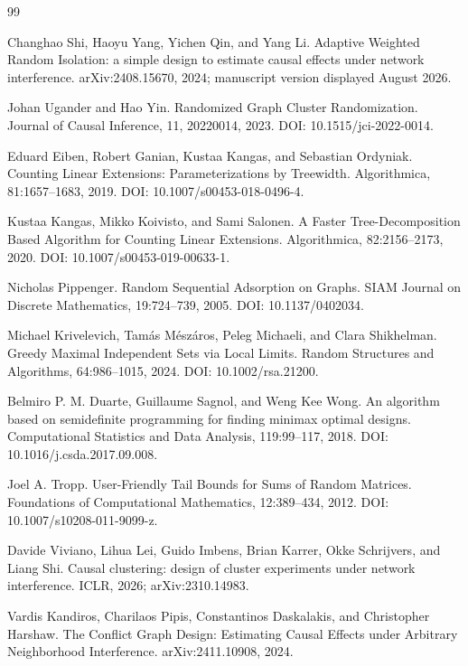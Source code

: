 \documentclass{article}
\begin{document}
\begin{thebibliography}{99}

   Changhao Shi, Haoyu Yang, Yichen Qin, and Yang Li. Adaptive Weighted Random Isolation: a simple design to estimate causal effects under network interference. arXiv:2408.15670, 2024; manuscript version displayed August 2026.

   Johan Ugander and Hao Yin. Randomized Graph Cluster Randomization. Journal of Causal Inference, 11, 20220014, 2023. DOI: 10.1515/jci-2022-0014.

   Eduard Eiben, Robert Ganian, Kustaa Kangas, and Sebastian Ordyniak. Counting Linear Extensions: Parameterizations by Treewidth. Algorithmica, 81:1657--1683, 2019. DOI: 10.1007/s00453-018-0496-4.

   Kustaa Kangas, Mikko Koivisto, and Sami Salonen. A Faster Tree-Decomposition Based Algorithm for Counting Linear Extensions. Algorithmica, 82:2156--2173, 2020. DOI: 10.1007/s00453-019-00633-1.

   Nicholas Pippenger. Random Sequential Adsorption on Graphs. SIAM Journal on Discrete Mathematics, 19:724--739, 2005. DOI: 10.1137/0402034.

   Michael Krivelevich, Tamás Mészáros, Peleg Michaeli, and Clara Shikhelman. Greedy Maximal Independent Sets via Local Limits. Random Structures and Algorithms, 64:986--1015, 2024. DOI: 10.1002/rsa.21200.

   Belmiro P. M. Duarte, Guillaume Sagnol, and Weng Kee Wong. An algorithm based on semidefinite programming for finding minimax optimal designs. Computational Statistics and Data Analysis, 119:99--117, 2018. DOI: 10.1016/j.csda.2017.09.008.

   Joel A. Tropp. User-Friendly Tail Bounds for Sums of Random Matrices. Foundations of Computational Mathematics, 12:389--434, 2012. DOI: 10.1007/s10208-011-9099-z.

   Davide Viviano, Lihua Lei, Guido Imbens, Brian Karrer, Okke Schrijvers, and Liang Shi. Causal clustering: design of cluster experiments under network interference. ICLR, 2026; arXiv:2310.14983.

   Vardis Kandiros, Charilaos Pipis, Constantinos Daskalakis, and Christopher Harshaw. The Conflict Graph Design: Estimating Causal Effects under Arbitrary Neighborhood Interference. arXiv:2411.10908, 2024.


\end{thebibliography}
\end{document}
